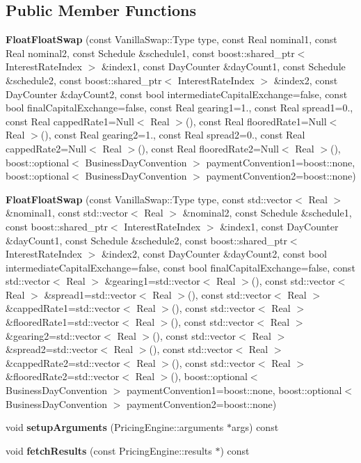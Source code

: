 \subsection*{Public Member Functions}
\begin{DoxyCompactItemize}
\item 
{\bfseries Float\+Float\+Swap} (const Vanilla\+Swap\+::\+Type type, const Real nominal1, const Real nominal2, const Schedule \&schedule1, const boost\+::shared\+\_\+ptr$<$ Interest\+Rate\+Index $>$ \&index1, const Day\+Counter \&day\+Count1, const Schedule \&schedule2, const boost\+::shared\+\_\+ptr$<$ Interest\+Rate\+Index $>$ \&index2, const Day\+Counter \&day\+Count2, const bool intermediate\+Capital\+Exchange=false, const bool final\+Capital\+Exchange=false, const Real gearing1=1., const Real spread1=0., const Real capped\+Rate1=Null$<$ Real $>$(), const Real floored\+Rate1=Null$<$ Real $>$(), const Real gearing2=1., const Real spread2=0., const Real capped\+Rate2=Null$<$ Real $>$(), const Real floored\+Rate2=Null$<$ Real $>$(), boost\+::optional$<$ Business\+Day\+Convention $>$ payment\+Convention1=boost\+::none, boost\+::optional$<$ Business\+Day\+Convention $>$ payment\+Convention2=boost\+::none)\label{class_quant_lib_1_1_float_float_swap_a88ea8a228b4d2eda56e15e8ff68ee3f4}

\item 
{\bfseries Float\+Float\+Swap} (const Vanilla\+Swap\+::\+Type type, const std\+::vector$<$ Real $>$ \&nominal1, const std\+::vector$<$ Real $>$ \&nominal2, const Schedule \&schedule1, const boost\+::shared\+\_\+ptr$<$ Interest\+Rate\+Index $>$ \&index1, const Day\+Counter \&day\+Count1, const Schedule \&schedule2, const boost\+::shared\+\_\+ptr$<$ Interest\+Rate\+Index $>$ \&index2, const Day\+Counter \&day\+Count2, const bool intermediate\+Capital\+Exchange=false, const bool final\+Capital\+Exchange=false, const std\+::vector$<$ Real $>$ \&gearing1=std\+::vector$<$ Real $>$(), const std\+::vector$<$ Real $>$ \&spread1=std\+::vector$<$ Real $>$(), const std\+::vector$<$ Real $>$ \&capped\+Rate1=std\+::vector$<$ Real $>$(), const std\+::vector$<$ Real $>$ \&floored\+Rate1=std\+::vector$<$ Real $>$(), const std\+::vector$<$ Real $>$ \&gearing2=std\+::vector$<$ Real $>$(), const std\+::vector$<$ Real $>$ \&spread2=std\+::vector$<$ Real $>$(), const std\+::vector$<$ Real $>$ \&capped\+Rate2=std\+::vector$<$ Real $>$(), const std\+::vector$<$ Real $>$ \&floored\+Rate2=std\+::vector$<$ Real $>$(), boost\+::optional$<$ Business\+Day\+Convention $>$ payment\+Convention1=boost\+::none, boost\+::optional$<$ Business\+Day\+Convention $>$ payment\+Convention2=boost\+::none)\label{class_quant_lib_1_1_float_float_swap_af6afb32a87391138dd9a2629f6ffe56c}

\item 
void {\bfseries setup\+Arguments} (Pricing\+Engine\+::arguments $\ast$args) const \label{class_quant_lib_1_1_float_float_swap_ae6341c9cc4549d7c41cbcb8890a3ba97}

\item 
void {\bfseries fetch\+Results} (const Pricing\+Engine\+::results $\ast$) const \label{class_quant_lib_1_1_float_float_swap_a4ea996bdd847351309f2f3a483e0e115}

\end{DoxyCompactItemize}
